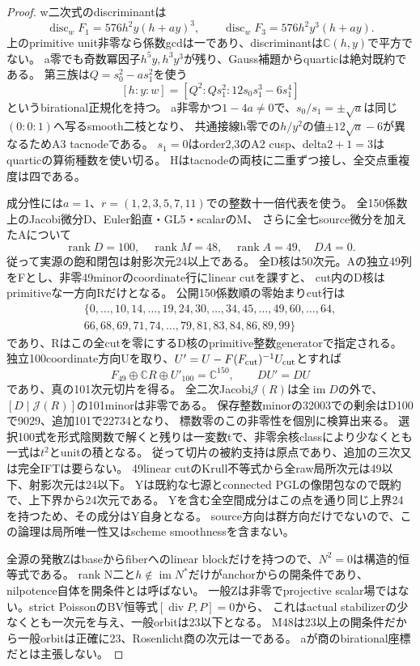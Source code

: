 \documentclass[a4paper,11pt]{ltjsarticle}
\theoremstyle{definition}
\newcommand{\rank}{\operatorname{rank}}
\begin{document}
\begin{proof}
w二次式のdiscriminantは
\[
 \operatorname{disc}_wF_1=576h^2y(h+ay)^3,\qquad
 \operatorname{disc}_wF_3=576h^2y^3(h+ay).
\]
上のprimitive unit非零なら係数gcdは一であり、discriminantは$\mathbb C(h,y)$で平方でない。
a零でも奇数冪因子$h^5y,h^3y^3$が残り、Gauss補題からquarticは絶対既約である。
第三族は$Q=s_0^2-as_1^2$を使う
\[
 [h:y:w]=[Q^2:Qs_1^2:12s_0s_1^3-6s_1^4]
\]
というbirational正規化を持つ。
a非零かつ$1-4a\ne0$で、$s_0/s_1=\pm\sqrt a$は同じ$(0:0:1)$へ写るsmooth二枝となり、
共通接線h零での$h/y^2$の値$\pm12\sqrt a-6$が異なるためA3 tacnodeである。
$s_1=0$はorder2,3のA2 cusp、delta$2+1=3$はquarticの算術種数を使い切る。
Hはtacnodeの両枝に二重ずつ接し、全交点重複度は四である。

成分性には$a=1$、$r=(1,2,3,5,7,11)$での整数十一倍代表を使う。
全150係数上のJacobi微分D、Euler鉛直・GL5・scalarのM、
さらに全七source微分を加えたAについて
\[
 \rank D=100,\quad\rank M=48,\quad\rank A=49,\quad DA=0.
\]
従って実源の飽和閉包は射影次元24以上である。
全D核は50次元。Aの独立49列をFとし、非零49minorのcoordinate行にlinear cutを課すと、
cut内のD核はprimitiveな一方向Rだけとなる。
公開150係数順の零始まりcut行は
\[
\begin{gathered}
 \{0,\ldots,10,14,\ldots,19,24,30,\ldots,34,45,\ldots,49,60,\ldots,64,\\
 66,68,69,71,74,\ldots,79,81,83,84,86,89,99\}
\end{gathered}
\]
であり、Rはこの全cutを零にするD核のprimitive整数generatorで指定される。
独立100coordinate方向Uを取り、$U'=U-F(F_{\rm cut})^{-1}U_{\rm cut}$とすれば
\[
 F_{49}\oplus\mathbb CR\oplus U'_{100}=\mathbb C^{150},\qquad DU'=DU
\]
であり、真の101次元切片を得る。
全二次Jacobi$\mathcal J(R)$は全$\operatorname{im}D$の外で、
$[D\mid\mathcal J(R)]$の101minorは非零である。
保存整数minorの32003での剰余はD100で9029、追加101で22734となり、
標数零のこの非零性を個別に検算出来る。
選択100式を形式陰関数で解くと残りは一変数tで、非零余核classにより少なくとも一式は$t^2$とunitの積となる。
従って切片の被約支持は原点であり、追加の三次又は完全IFTは要らない。
49linear cutのKrull不等式から全raw局所次元は49以下、射影次元は24以下。
Yは既約な七源とconnected PGLの像閉包なので既約で、上下界から24次元である。
Yを含む全空間成分はこの点を通り同じ上界24を持つため、その成分はY自身となる。
source方向は群方向だけでないので、この論理は局所唯一性又はscheme smoothnessを含まない。

全源の発散Zはbaseからfiberへのlinear blockだけを持つので、$N^2=0$は構造的恒等式である。
rank N二と$h\notin\operatorname{im}N^*$だけがanchorからの開条件であり、nilpotence自体を開条件とは呼ばない。
一般Zは非零でprojective scalar場ではない。strict PoissonのBV恒等式$[\operatorname{div}P,P]=0$から、
これはactual stabilizerの少なくとも一次元を与え、一般orbitは23以下となる。
M48は23以上の開条件だから一般orbitは正確に23、Rosenlicht商の次元は一である。
aが商のbirational座標だとは主張しない。


\end{proof}
\end{document}

